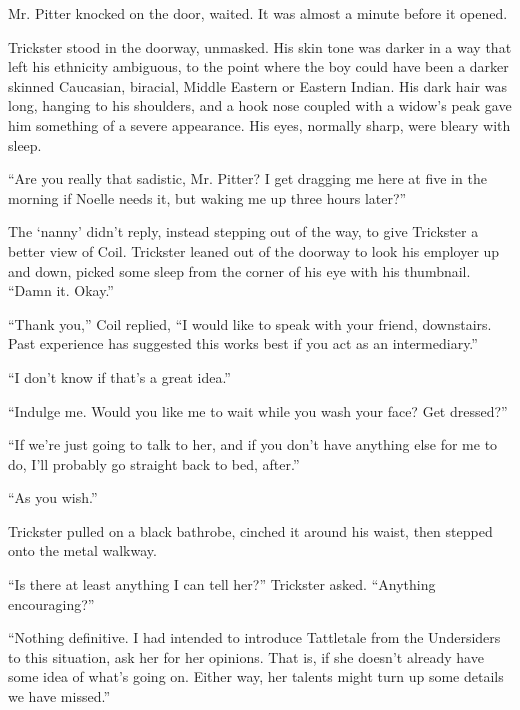 Mr. Pitter knocked on the door, waited.  It was almost a minute before it opened.



Trickster stood in the doorway, unmasked.  His skin tone was darker in a way that left his ethnicity ambiguous, to the point where the boy could have been a darker skinned Caucasian, biracial, Middle Eastern or Eastern Indian.  His dark hair was long, hanging to his shoulders, and a hook nose coupled with a widow's peak gave him something of a severe appearance.  His eyes, normally sharp, were bleary with sleep.



``Are you really that sadistic, Mr. Pitter?  I get dragging me here at five in the morning if Noelle needs it, but waking me up three hours later?''



The `nanny' didn't reply, instead stepping out of the way, to give Trickster a better view of Coil.  Trickster leaned out of the doorway to look his employer up and down, picked some sleep from the corner of his eye with his thumbnail.  ``Damn it.  Okay.''



``Thank you,'' Coil replied, ``I would like to speak with your friend, downstairs.  Past experience has suggested this works best if you act as an intermediary.''



``I don't know if that's a great idea.''



``Indulge me.  Would you like me to wait while you wash your face?  Get dressed?''



``If we're just going to talk to her, and if you don't have anything else for me to do, I'll probably go straight back to bed, after.''



``As you wish.''



Trickster pulled on a black bathrobe, cinched it around his waist, then stepped onto the metal walkway.



``Is there at least anything I can tell her?'' Trickster asked.  ``Anything encouraging?''



``Nothing definitive.  I had intended to introduce Tattletale from the Undersiders to this situation, ask her for her opinions.  That is, if she doesn't already have some idea of what's going on.  Either way, her talents might turn up some details we have missed.''



